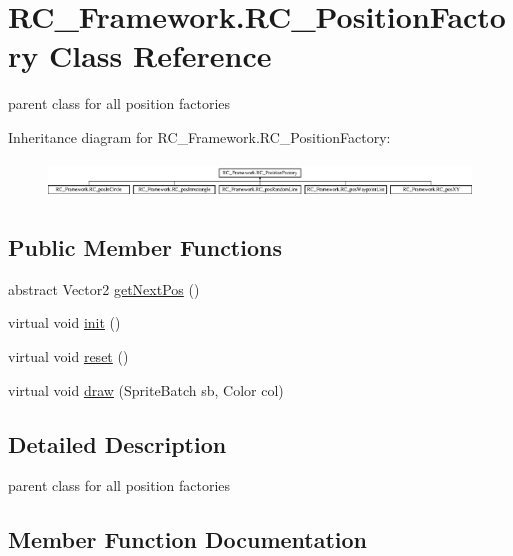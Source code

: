 \hypertarget{class_r_c___framework_1_1_r_c___position_factory}{}\section{R\+C\+\_\+\+Framework.\+R\+C\+\_\+\+Position\+Factory Class Reference}
\label{class_r_c___framework_1_1_r_c___position_factory}


parent class for all position factories  


Inheritance diagram for R\+C\+\_\+\+Framework.\+R\+C\+\_\+\+Position\+Factory\+:\begin{figure}[H]
\begin{center}
\leavevmode
\includegraphics[height=0.991150cm]{class_r_c___framework_1_1_r_c___position_factory}
\end{center}
\end{figure}
\subsection*{Public Member Functions}
\begin{DoxyCompactItemize}
\item 
abstract Vector2 \mbox{\hyperlink{class_r_c___framework_1_1_r_c___position_factory_aab6cd4cb6a10c8dfa126c4930c6a9fbf}{get\+Next\+Pos}} ()
\item 
virtual void \mbox{\hyperlink{class_r_c___framework_1_1_r_c___position_factory_af966db836e692a5a485531d227caa944}{init}} ()
\item 
virtual void \mbox{\hyperlink{class_r_c___framework_1_1_r_c___position_factory_a582a8b01a360280d67b199b1190d96f7}{reset}} ()
\item 
virtual void \mbox{\hyperlink{class_r_c___framework_1_1_r_c___position_factory_a39eaa0f4f1dfd07225b4880d494d81fa}{draw}} (Sprite\+Batch sb, Color col)
\end{DoxyCompactItemize}


\subsection{Detailed Description}
parent class for all position factories 



\subsection{Member Function Documentation}
\mbox{\label{class_r_c___framework_1_1_r_c___position_factory_a39eaa0f4f1dfd07225b4880d494d81fa}} 
